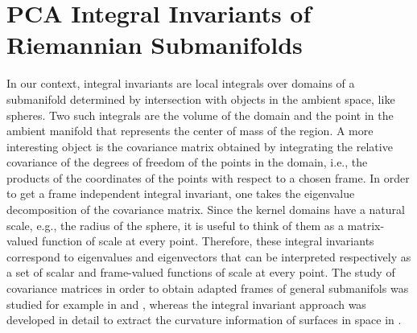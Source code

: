 \documentclass[letterpaper, reqno, 11pt]{amsart}
\theoremstyle{definition}
\theoremstyle{remark}
\numberwithin{equation}{section}
\begin{document}
\section{PCA Integral Invariants of Riemannian Submanifolds}\label{sec:IntInv}

In our context, integral invariants are local integrals over domains of a submanifold determined by intersection with objects in the ambient space, like spheres. Two such integrals are the volume of the domain and the point in the ambient manifold that represents the center of mass of the region. A more interesting object is the covariance matrix obtained by integrating the relative covariance of the degrees of freedom of the points in the domain, i.e., the products of the coordinates of the points with respect to a chosen frame. In order to get a frame independent integral invariant, one takes the eigenvalue decomposition of the covariance matrix. Since the kernel domains have a natural scale, e.g., the radius of the sphere, it is useful to think of them as a matrix-valued function of scale at every point. Therefore, these integral invariants correspond to eigenvalues and eigenvectors that can be interpreted respectively as a set of scalar and frame-valued functions of scale at every point. The study of covariance matrices in order to obtain adapted frames of general submanifols was studied for example in \cite{broomhead1991local} and \cite{solis1993,solis2000}, whereas the integral invariant approach was developed in detail to extract the curvature information of surfaces in space in \cite{pottmann2007}.
\end{document}

